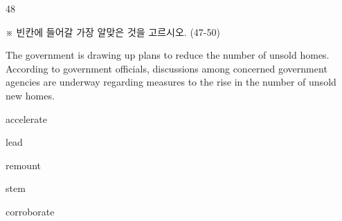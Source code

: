 \begin{question}{48}
\begin{framedtext}
※ 빈칸에 들어갈 가장 알맞은 것을 고르시오. (47-50) \par
\end{framedtext}
The government is drawing up plans to reduce the number of unsold homes. According to government officials, discussions among concerned government agencies are underway regarding measures to \blank{} the rise in the number of unsold new homes.
\begin{choices}
  \item accelerate
  \item lead
  \item remount
  \item stem
  \item corroborate
\end{choices}
\end{question}
